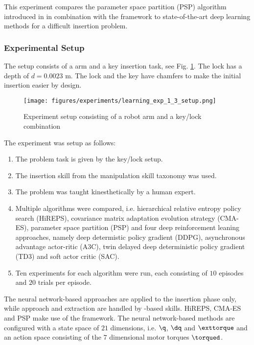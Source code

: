 This experiment compares the parameter space partition (PSP) algorithm introduced in \cite{Voigt.2021} in combination with the \skillmodelabbr{} framework to state-of-the-art deep learning methods for a difficult insertion problem.

\subsubsection{Experimental Setup}

The setup consists of a \platformname{} arm and a key insertion task, see Fig. \ref{fig:learning:exp_1_3:setup}.
The lock has a depth of $d=0.0023$ m.
The lock and the key have chamfers to make the initial insertion easier by design.

\begin{figure}[ht!]
\texttt{[image: figures/experiments/learning\_exp\_1\_3\_setup.png]}
\caption{Experiment setup consisting of a robot arm and a key/lock combination}
\label{fig:learning:exp_1_3:setup}
\end{figure}

The experiment was setup as follows:
\begin{enumerate}
\item The problem task is given by the key/lock setup.
\item The insertion skill from the manipulation skill taxonomy was used.
\item The problem was taught kinesthetically by a human expert.
\item Multiple algorithms were compared, i.e. hierarchical relative entropy policy search (HiREPS), covariance matrix adaptation evolution strategy (CMA-ES), parameter space partition (PSP) and four deep reinforcement leaning approaches, namely deep determistic policy gradient (DDPG), asynchronous advantage actor-ritic (A3C), twin delayed deep deterministic policy gradient (TD3) and soft actor critic (SAC).
\item Ten experiments for each algorithm were run, each consisting of $10$ episodes and $20$ trials per episode.
\end{enumerate}

The neural network-based approaches are applied to the insertion phase only, while approach and extraction are handled by \skillmodelabbr{}-based skills.
HiREPS, CMA-ES and PSP make use of the \skillmodelabbr{} framework.
The neural network-based methods are configured with a state space of $21$ dimensions, i.e. $\q$, $\dq$ and $\exttorque$ and an action space consisting of the $7$ dimensional motor torques $\torqued$.

